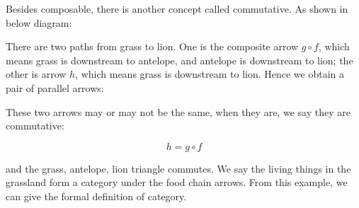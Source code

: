 \documentclass{article}
\begin{document}
Besides composable, there is another concept called commutative. As shown in below diagram:

\begin{center}
\end{center}

There are two paths from grass to lion. One is the composite arrow $g \circ f$, which means grass is downstream to antelope, and antelope is downstream to lion; the other is arrow $h$, which means grass is downstream to lion. Hence we obtain a pair of parallel arrows:

\begin{center}
\end{center}

These two arrows may or may not be the same, when they are, we say they are commutative:

\[
h = g \circ f
\]

and the grass, antelope, lion triangle commutes. We say the living things in the grassland form a category under the food chain arrows. From this example, we can  give the formal definition of category.
\end{document}
